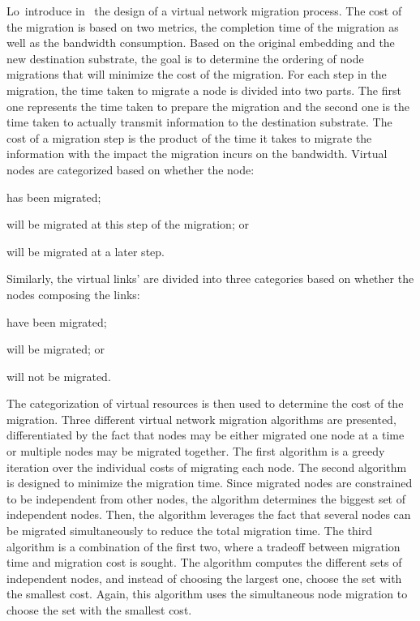 Lo~\etal introduce in~\cite{vnm-lo2013} the design of a virtual network migration process.
The cost of the migration is based on two metrics, the completion time of the migration as well as the bandwidth consumption.
Based on the original embedding and the new destination substrate, the goal is to determine the ordering of node migrations that will minimize the cost of the migration.
For each step in the migration, the time taken to migrate a node is divided into two parts. The first one represents the time taken to prepare the migration and the second one is the time taken to actually transmit information to the destination substrate.
The cost of a migration step is the product of the time it takes to migrate the information with the impact the migration incurs on the bandwidth.
Virtual nodes are categorized based on whether the node:
\begin{inparaenum}[i)] 
\item has been migrated;
\item will be migrated at this step of the migration; or 
\item will be migrated at a later step.
\end{inparaenum}
Similarly, the virtual links' are divided into three categories based on whether the nodes composing the links:
\begin{inparaenum}[i)]
\item have been migrated;
\item will be migrated; or 
\item will not be migrated.
\end{inparaenum}
The categorization of virtual resources is then used to determine the cost of the migration.
Three different virtual network migration algorithms are presented, differentiated by the fact that nodes may be either migrated one node at a time or multiple nodes may be migrated together.
The first algorithm is a greedy iteration over the individual costs of migrating each node.
The second algorithm is designed to minimize the migration time. Since migrated nodes are constrained to be independent from other nodes, the algorithm determines the biggest set of independent nodes.
Then, the algorithm leverages the fact that several nodes can be migrated simultaneously to reduce the total migration time.
The third algorithm is a combination of the first two, where a tradeoff between migration time and migration cost is sought. The algorithm computes the different sets of independent nodes, and instead of choosing the largest one, choose the set with the smallest cost.
Again, this algorithm uses the simultaneous node migration to choose the set with the smallest cost.

